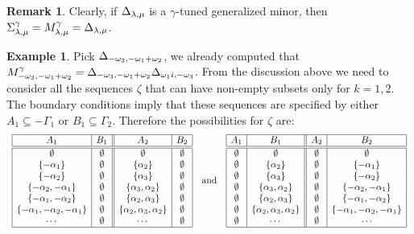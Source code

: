 \documentclass[a4paper]{amsart}
\theoremstyle{definition}
\newtheorem{remark}[theorem]{Remark}
\newtheorem{example}[theorem]{Example}
\begin{document}
\begin{remark}
  Clearly, if $\minor[\lambda][\mu]$ is a $\gamma$-tuned generalized minor, then $\function[\lambda][\mu]=\monomial[\lambda][\mu]=\minor[\lambda][\mu]$.
\end{remark}

\begin{example}
  Pick $\minor[-\omega_3][-\omega_1+\omega_2]$, we already computed that $\monomial[-\omega_3][-\omega_1+\omega_2]=\minor[-\omega_3][-\omega_1+\omega_2] \minor[\omega_1i][-\omega_3]$.
  From the discussion above we need to consider all the sequences $\zeta$ that can have non-empty subsets only for $k=1,2$.
  The boundary conditions imply that these sequences are specified by either $A_1\subseteq-\Gamma_1$ or $B_1\subseteq \Gamma_2$.
  Therefore the possibilities for $\zeta$ are:
  \[
    \begin{array}{ccc}

     \begin{array}{|c|c||c|c|}
       \hline
       A_1 & B_1 & A_2 & B_2\\
       \hline
       \hline
       \emptyset &\emptyset &\emptyset &\emptyset \\
       \{-\alpha_1\} & \emptyset & \{\alpha_2\} & \emptyset\\
       \{-\alpha_2\} & \emptyset & \{\alpha_3\} & \emptyset\\
       \{-\alpha_2,-\alpha_1\} & \emptyset & \{\alpha_3,\alpha_2\} & \emptyset\\
       \{-\alpha_1,-\alpha_2\} & \emptyset & \{\alpha_2,\alpha_3\} & \emptyset\\
       \{-\alpha_1,-\alpha_2,-\alpha_1\} & \emptyset & \{\alpha_2,\alpha_3,\alpha_2\} & \emptyset\\
       \cdots & \emptyset & \cdots & \emptyset \\
       \hline
     \end{array}
     
     & \mbox{and} &

     \begin{array}{|c|c||c|c|}
       \hline
       A_1 & B_1 & A_2 & B_2\\
       \hline
       \hline
       \emptyset &\emptyset &\emptyset &\emptyset \\
       \emptyset &\{\alpha_2\} & \emptyset & \{-\alpha_1\} \\
       \emptyset &\{\alpha_3\} & \emptyset & \{-\alpha_2\} \\
       \emptyset &\{\alpha_3,\alpha_2\} & \emptyset & \{-\alpha_2,-\alpha_1\} \\
       \emptyset &\{\alpha_2,\alpha_3\} & \emptyset & \{-\alpha_1,-\alpha_2\} \\
       \emptyset &\{\alpha_2,\alpha_3,\alpha_2\} & \emptyset & \{-\alpha_1,-\alpha_2,-\alpha_1\} \\
       \emptyset &\cdots & \emptyset & \cdots \\
       \hline
     \end{array}


\end{array}\]
\end{example}
\end{document}
